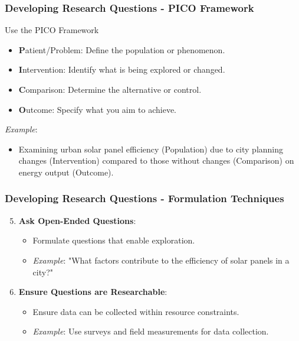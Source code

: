 \documentclass[aspectratio=169]{beamer}
\begin{document}
\begin{frame}[fragile]
    \frametitle{Developing Research Questions - PICO Framework}
    \begin{block}{Use the PICO Framework}
        \begin{itemize}
            \item \textbf{P}atient/Problem: Define the population or phenomenon.
            \item \textbf{I}ntervention: Identify what is being explored or changed.
            \item \textbf{C}omparison: Determine the alternative or control.
            \item \textbf{O}utcome: Specify what you aim to achieve.
        \end{itemize}
    \end{block}
    \vfill
    \textit{Example}: 
    \begin{itemize}
        \item Examining urban solar panel efficiency (Population) due to city planning changes (Intervention) compared to those without changes (Comparison) on energy output (Outcome).
    \end{itemize}
\end{frame}

\begin{frame}[fragile]
    \frametitle{Developing Research Questions - Formulation Techniques}
    \begin{enumerate}
        \setcounter{enumi}{4}
        \item \textbf{Ask Open-Ended Questions}:
            \begin{itemize}
                \item Formulate questions that enable exploration.
                \item \textit{Example}: "What factors contribute to the efficiency of solar panels in a city?"
            \end{itemize}
        \item \textbf{Ensure Questions are Researchable}:
            \begin{itemize}
                \item Ensure data can be collected within resource constraints.
                \item \textit{Example}: Use surveys and field measurements for data collection.
            \end{itemize}
    \end{enumerate}
\end{frame}
\end{document}
